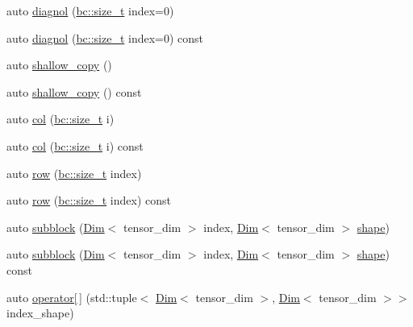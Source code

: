 \begin{DoxyCompactItemize}
\item 
auto \hyperlink{classbc_1_1tensors_1_1Tensor__Accessor__Base_a5f79fccfe2489d1c01594bd9f918b52a}{diagnol} (\hyperlink{namespacebc_aaf8e3fbf99b04b1b57c4f80c6f55d3c5}{bc\+::size\+\_\+t} index=0)
\item 
auto \hyperlink{classbc_1_1tensors_1_1Tensor__Accessor__Base_acbe85b2ef3eadd07ecad796a3bff6c2c}{diagnol} (\hyperlink{namespacebc_aaf8e3fbf99b04b1b57c4f80c6f55d3c5}{bc\+::size\+\_\+t} index=0) const
\item 
auto \hyperlink{classbc_1_1tensors_1_1Tensor__Accessor__Base_a990fec0a9f4b67d56d9e51bf544345c9}{shallow\+\_\+copy} ()
\item 
auto \hyperlink{classbc_1_1tensors_1_1Tensor__Accessor__Base_ab9fd6d180e84d54c6072cfb1e50c1c7b}{shallow\+\_\+copy} () const
\item 
auto \hyperlink{classbc_1_1tensors_1_1Tensor__Accessor__Base_aeb6ba61c9c053333c46f61bc2c3746fb}{col} (\hyperlink{namespacebc_aaf8e3fbf99b04b1b57c4f80c6f55d3c5}{bc\+::size\+\_\+t} i)
\item 
auto \hyperlink{classbc_1_1tensors_1_1Tensor__Accessor__Base_a129bec251f9ba41620bbf5faa4e4588b}{col} (\hyperlink{namespacebc_aaf8e3fbf99b04b1b57c4f80c6f55d3c5}{bc\+::size\+\_\+t} i) const
\item 
auto \hyperlink{classbc_1_1tensors_1_1Tensor__Accessor__Base_a656a59f5685cec6c053db095a510ddb3}{row} (\hyperlink{namespacebc_aaf8e3fbf99b04b1b57c4f80c6f55d3c5}{bc\+::size\+\_\+t} index)
\item 
auto \hyperlink{classbc_1_1tensors_1_1Tensor__Accessor__Base_a31baf21f8e0ee8dd55d5e1e9a9a91cc1}{row} (\hyperlink{namespacebc_aaf8e3fbf99b04b1b57c4f80c6f55d3c5}{bc\+::size\+\_\+t} index) const
\item 
auto \hyperlink{classbc_1_1tensors_1_1Tensor__Accessor__Base_af991c2757db619e67d6291a8cf46f79f}{subblock} (\hyperlink{structbc_1_1Dim}{Dim}$<$ tensor\+\_\+dim $>$ index, \hyperlink{structbc_1_1Dim}{Dim}$<$ tensor\+\_\+dim $>$ \hyperlink{namespacebc_a1bc6dec532973ac024c738c0fd32cca3}{shape})
\item 
auto \hyperlink{classbc_1_1tensors_1_1Tensor__Accessor__Base_ab3e8e0661cfbfbb982c871f8cc814dfb}{subblock} (\hyperlink{structbc_1_1Dim}{Dim}$<$ tensor\+\_\+dim $>$ index, \hyperlink{structbc_1_1Dim}{Dim}$<$ tensor\+\_\+dim $>$ \hyperlink{namespacebc_a1bc6dec532973ac024c738c0fd32cca3}{shape}) const
\item 
auto \hyperlink{classbc_1_1tensors_1_1Tensor__Accessor__Base_a19adf43803db2cbdd638ce7cddf023de}{operator\mbox{[}$\,$\mbox{]}} (std\+::tuple$<$ \hyperlink{structbc_1_1Dim}{Dim}$<$ tensor\+\_\+dim $>$, \hyperlink{structbc_1_1Dim}{Dim}$<$ tensor\+\_\+dim $>$$>$ index\+\_\+shape)
$$
\end{DoxyCompactItemize}
